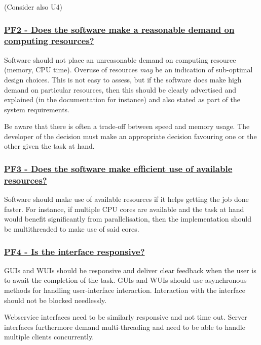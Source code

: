 \documentclass[a4paper,11pt]{article}
\newcommand{\criterion}[2]{\subsubsection*{\underline{#1 - #2}}\label{id:#1}}
\newcommand\CheckTable{%
  \begin{tabular}{ccccc}
    No & Minimal & Adequate & Good & Perfect \\
    0 & 1 & 2 & 3 & 4 \\
    \hline
    $\square$ & $\square$ & $\square$ & $\square$ & $\square$ \\
  \end{tabular}%
}
\begin{document}
%
%
%
(Consider also U4)


\newcommand{\pfTwoID}{PF2}
\newcommand{\pfTwoText}{Does the software make a reasonable demand on computing resources?}
\criterion{\pfTwoID}{\pfTwoText}

Software should not place an unreasonable demand on computing resource (memory,
CPU time). Overuse of resources \emph{may} be an indication of sub-optimal
design choices.  This is not easy to assess, but if the software does make high
demand on particular resources, then this should be clearly advertised and
explained (in the documentation for instance) and also stated as part of the
system requirements.

Be aware that there is often a trade-off between speed and memory usage. The
developer of the decision must make an appropriate decision favouring one or the other
given the task at hand. 


\newcommand{\pfThreeID}{PF3}
\newcommand{\pfThreeText}{Does the software make efficient use of available resources?}
\criterion{\pfThreeID}{\pfThreeText}

Software should make use of available resources if it helps getting the job
done faster. For instance, if multiple CPU cores are available and the task at hand
would benefit significantly from parallelisation, then the implementation should be
multithreaded to make use of said cores.


\newcommand{\pfFourID}{PF4}
\newcommand{\pfFourText}{Is the interface responsive?}
\criterion{\pfFourID}{\pfFourText}

GUIs and WUIs should be responsive and deliver clear feedback when the user is
to await the completion of the task. GUIs and WUIs should use asynchronous methods for
handling user-interface interaction. Interaction with the interface should not
be blocked needlessly.

Webservice interfaces need to be similarly responsive and not time out. Server interfaces furthermore demand multi-threading and need to be able to handle
multiple clients concurrently.
\end{document}
